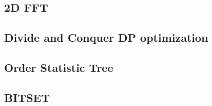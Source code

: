 \documentclass[10pt,landscape,a4paper,twocolumn]{article}
\begin{document}
\subsection{2D FFT}


\subsection{Divide and Conquer DP optimization}


\subsection{Order Statistic Tree}


\subsection{BITSET}



\clearpage
\null
\clearpage
\null
\clearpage
\null
\clearpage
\null
\clearpage
\null
\end{document}
